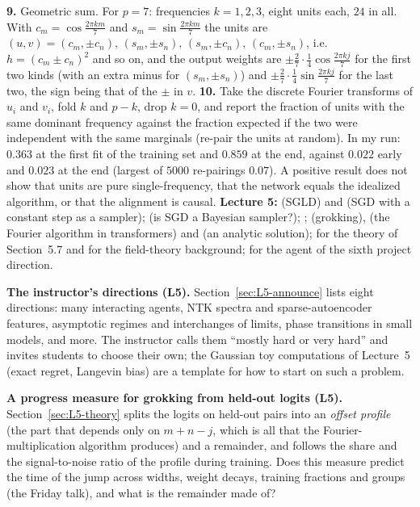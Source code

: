 \textbf{9.} Geometric sum. For $p=7$: frequencies $k=1,2,3$, eight units each, $24$ in all. With $c_m=\cos\frac{2\pi km}7$ and $s_m=\sin\frac{2\pi km}7$ the units are $(u,v)=(c_m,\pm c_n),\,(s_m,\pm s_n),\,(s_m,\pm c_n),\,(c_m,\pm s_n)$, i.e.\ $h=(c_m\pm c_n)^2$ and so on, and the output weights are $\pm\frac27\cdot\frac14\cos\frac{2\pi kj}7$ for the first two kinds (with an extra minus for $(s_m,\pm s_n)$) and $\pm\frac27\cdot\frac14\sin\frac{2\pi kj}7$ for the last two, the sign being that of the $\pm$ in $v$. \quad
\textbf{10.} Take the discrete Fourier transforms of $u_i$ and $v_i$, fold $k$ and $p-k$, drop $k=0$, and report the fraction of units with the same dominant frequency against the fraction expected if the two were independent with the same marginals (re-pair the units at random). In my run: $0.363$ at the first fit of the training set and $0.859$ at the end, against $0.022$ early and $0.023$ at the end (largest of $5000$ re-pairings $0.07$). A positive result does not show that units are pure single-frequency, that the network equals the idealized algorithm, or that the alignment is causal.
\textbf{Lecture 5:} \citet{welling2011} (SGLD) and \citet{mandt2017} (SGD with a constant step as a sampler); \citet{mingard2021} (is SGD a Bayesian sampler?); \citet{neal1996}; \citet{power2022} (grokking), \citet{nanda2023} (the Fourier algorithm in transformers) and \citet{gromov2023} (an analytic solution); \citet{rubin2024} for the theory of Section~5.7 and \citet{ringel2025} for the field-theory background; \citet{hutter2005} for the agent of the sixth project direction.
  \item \textbf{The instructor's directions (L5).} Section~\ref{sec:L5-announce} lists eight directions: many interacting agents, NTK spectra and sparse-autoencoder features, asymptotic regimes and interchanges of limits, phase transitions in small models, and more. The instructor calls them ``mostly hard or very hard'' and invites students to choose their own; the Gaussian toy computations of Lecture~5 (exact regret, Langevin bias) are a template for how to start on such a problem.
  \item \textbf{A progress measure for grokking from held-out logits (L5).} Section~\ref{sec:L5-theory} splits the logits on held-out pairs into an \emph{offset profile} (the part that depends only on $m+n-j$, which is all that the Fourier-multiplication algorithm produces) and a remainder, and follows the share and the signal-to-noise ratio of the profile during training. Does this measure predict the time of the jump across widths, weight decays, training fractions and groups (the Friday talk), and what is the remainder made of?
